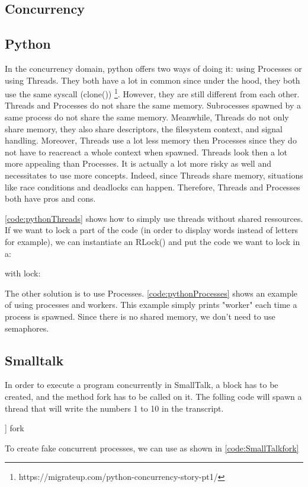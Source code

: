 \documentclass[12pt,a4paper]{scrartcl}
\begin{document}
\begin{multicols}{2}
\section{Concurrency}
\subsection{Python}
In the concurrency domain, python offers two ways of doing it: using Processes or using Threads. They both have a lot in common since under the hood, they both use the same syscall (clone()) \footnote{https://migrateup.com/python-concurrency-story-pt1/}. However, they are still different from each other. Threads and Processes do not share the same memory. Subrocesses spawned by a same process do not share the same memory. Meanwhile, Threads do not only share memory, they also share  descriptors, the filesystem context, and signal handling. Moreover, Threads use a lot less memory then Processes since they do not have to reacreact a whole context when spawned.
Threads look then a lot more appealing than Processes. It is actually a lot more risky as well and necessitates to use more concepts. Indeed, since Threads share memory, situations like race conditions and deadlocks can happen. Therefore, Threads and Processes both have pros and cons.

\ref{code:pythonThreads} shows how to simply use threads without shared ressources. If we want to lock a part of the code (in order to display words instead of letters for example), we can instantiate an RLock() and put the code we want to lock in a:
\begin{python}
with lock:
\end{python}

The other solution is to use Processes. \ref{code:pythonProcesses} shows an example of using processes and workers. This example simply prints "worker" each time a process is spawned. Since there is no shared memory, we don't need to use semaphores.

\subsection{Smalltalk}
In order to execute a program concurrently in SmallTalk, a block has to be created, and the method fork has to be called on it. The folling code will spawn a thread that will write the numbers 1 to 10 in the transcript.
\begin{ST}
[ 1 to: 10 do: [ :i | Transcript show: i  printString ; cr ] ] fork
\end{ST}
To create fake concurrent processes, we can use as shown in \ref{code:SmallTalkfork}


\end{multicols}
\end{document}
